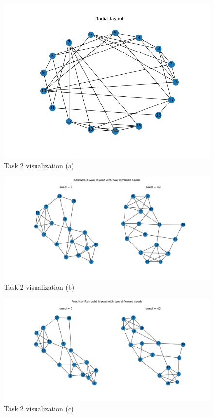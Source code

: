 \documentclass[11pt,a4paper,titlepage]{article}
\begin{document}
\begin{figure}[h]
    \centering
    \includegraphics[width=1.0\linewidth]{reports/assignment-4/imgs/radial.png}
    \caption{Task 2 visualization (a)}
    \label{fig:rad}
\end{figure}

\begin{figure}[h]
    \centering
    \includegraphics[width=1.0\linewidth]{reports/assignment-4/imgs/kk.png}
    \caption{Task 2 visualization (b)}
    \label{fig:kk}
\end{figure}

\begin{figure}[h]
    \centering
    \includegraphics[width=1.0\linewidth]{reports/assignment-4/imgs/fr.png}
    \caption{Task 2 visualization (c)}
    \label{fig:fr}
\end{figure}

\newpage


\end{document}
